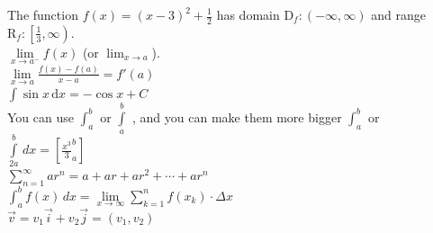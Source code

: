 \documentclass[12pt]{article}
\begin{document}
The function $f(x)=(x-3)^2+\frac{1}{2}$ has domain $ \mathrm{D}_f:(-\infty,\infty)$ and range $\mathrm{R}_f:\left. \left[\frac{1}{3},\infty\right.\right)$.\\

$\lim \limits_{x \to {a^-}} f(x) $ (or $ \lim_{x \to a} $).\\

$\displaystyle{\lim \limits_{x \to a} \frac{f(x)-f(a)}{x-a}=f'(a)}$\\

$\displaystyle{ \int \sin x \,\mathrm{d}x=-\cos x + C }$\\

You can use $ \int_a^b $ or $ \int \limits_a^b $ , and you can make them more bigger $ \displaystyle{ \int_a^b } $ or $ \displaystyle{ \int \limits_{2a}^{b}\,dx=\left[\frac{x^3}{3}_a^b\right]} $\\

$\displaystyle{\sum \limits_{n=1}^{\infty}ar^n=a+ar+ar^2+\cdots+ar^n} $\\

$ \displaystyle{ \int_{a}^{b}f(x)\,dx=\lim \limits_{x \to \infty} \sum_{k=1}^{n}f(x_k)\cdot \Delta x } $\\

$ \vec{v}=v_1 \vec{i} + v_2 \vec{j} = (v_1 , v_2) $
\end{document}
